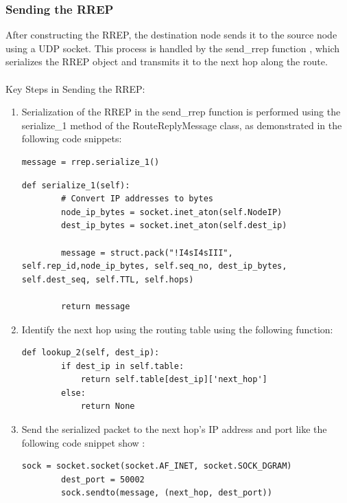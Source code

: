 \documentclass[]{nsm-thesis}
\begin{document}
\subsubsection{Sending the RREP}

After constructing the RREP, the destination node sends it to the source node using a UDP socket. This process is handled by the send\_rrep function , which serializes the RREP object and transmits it to the next hop along the route.\\
\\
Key Steps in Sending the RREP:
\begin{enumerate}
    \item Serialization of the RREP in the send\_rrep function is performed using the serialize\_1 method of the RouteReplyMessage class, as demonstrated in the following code snippets:

    \lstset{
  basicstyle=\ttfamily\small,  %
  numbers=left,               %
  numberstyle=\tiny,          %
  stepnumber=1,               %
  numbersep=5pt,              %
  showstringspaces=false,     %
  frame=single,               %
  breaklines=true,            %
  captionpos=b,               %
  language=Python             %
}
\begin{lstlisting}[caption={Serializing the RREP Instance }, label={lst:example}]
 message = rrep.serialize_1() 
\end{lstlisting}
\clearpage
\begin{lstlisting}[caption={Serialization of the RREP Function}, label={lst:example}]
def serialize_1(self):
        # Convert IP addresses to bytes
        node_ip_bytes = socket.inet_aton(self.NodeIP)
        dest_ip_bytes = socket.inet_aton(self.dest_ip)
        
        message = struct.pack("!I4sI4sIII", self.rep_id,node_ip_bytes, self.seq_no, dest_ip_bytes, self.dest_seq, self.TTL, self.hops)
        
        return message
\end{lstlisting}
    \item Identify the next hop using the routing table using the following function:
    \begin{lstlisting}[caption={Serialization of the RREP Function}, label={lst:example}]
def lookup_2(self, dest_ip):
        if dest_ip in self.table:
            return self.table[dest_ip]['next_hop']
        else:
            return None
\end{lstlisting}
    \item Send the serialized packet to the next hop’s IP address and port like the following code snippet show :
   \begin{lstlisting}[caption={Serialization of the RREP Function}, label={lst:example}]
        sock = socket.socket(socket.AF_INET, socket.SOCK_DGRAM)
        dest_port = 50002
        sock.sendto(message, (next_hop, dest_port))
\end{lstlisting}
   
\end{enumerate}
\end{document}
